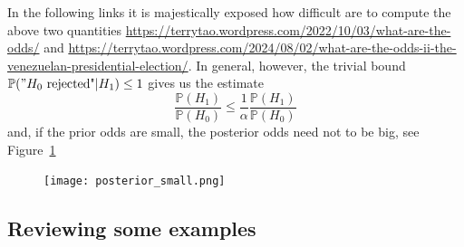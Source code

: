 	In the following links it is majestically exposed how difficult are to compute the above two quantities \url{https://terrytao.wordpress.com/2022/10/03/what-are-the-odds/} and \url{https://terrytao.wordpress.com/2024/08/02/what-are-the-odds-ii-the-venezuelan-presidential-election/}. 
	In general, however, the trivial bound $\mathbb P( "\text{$H_0$ rejected"}| H_1) \leq 1$ gives us the estimate 
	\begin{equation}
		\label{e:just_an_estimate}
		\frac{	\mathbb P(H_1 ) }{ \mathbb P(H_0 )} \leq \frac{1}{\alpha} \frac{\mathbb P(H_1)}{\mathbb P(H_0)}
	\end{equation} 
	and, if the prior odds are small, the posterior odds need not to be big, see Figure~\ref{f:posterior_small}
	\begin{figure}
	\texttt{[image: posterior\_small.png]}
	\label{f:posterior_small}
	\end{figure}

	\subsection{ Reviewing some examples}

